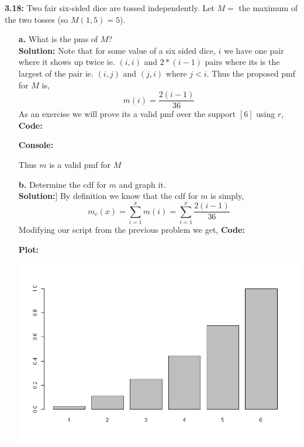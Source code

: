 \documentclass[12pt]{article}
\theoremstyle{homework}
\begin{document}
\textbf{3.18:} Two fair six-sided dice are tossed independently. Let $M = $ the maximum of the two tosses (so $M(1,5) = 5$).

\begin{enumerate}
  \item[\textbf{a.}] What is the pms of $M$?\\
 
  \textbf{Solution:} Note that for some value of a six sided dice, $i$ we have one pair where it shows up twice ie. $(i,i)$ and $2*(i-1)$ pairs where its is the largest of the pair ie. $(i,j)$ and $(j,i)$
  where $j < i$. Thus the proposed pmf for $M$ is,
  \begin{equation*}
    m(i) = \dfrac{2(i-1)}{36}
  \end{equation*}
  As an exercise we will prove its a valid pmf over the support $[6]$ using $r$,
  \textbf{Code:}
  
  \textbf{Console:}
  
  Thus $m$ is a valid pmf for $M$
  \vspace{.5in}

  \item[\textbf{b.}]Determine the cdf for $m$ and graph it.\\
  
  \textbf{Solution:}] By definition we know that the cdf for $m$ is simply, 
  \begin{equation*}
    m_c(x) = \sum_{i = 1}^x m(i) = \sum_{i = 1}^x \dfrac{2(i-1)}{36}
  \end{equation*} 
  Modifying our script from the previous problem we get, 
  \textbf{Code:}
  
  \textbf{Plot:}
  \begin{center}
    \includegraphics[width = .75\textwidth]{rplot.png}  
  \end{center}
  





\end{enumerate}
\end{document}
